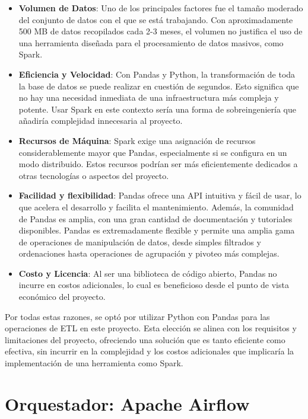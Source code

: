 \begin{itemize}
\item \textbf{Volumen de Datos}: Uno de los principales factores fue el tamaño moderado del conjunto de datos con el que se está trabajando. Con aproximadamente 500 MB de datos recopilados cada 2-3 meses, el volumen no justifica el uso de una herramienta diseñada para el procesamiento de datos masivos, como Spark.

\item \textbf{Eficiencia y Velocidad}: Con Pandas y Python, la transformación de toda la base de datos se puede realizar en cuestión de segundos. Esto significa que no hay una necesidad inmediata de una infraestructura más compleja y potente. Usar Spark en este contexto sería una forma de sobreingeniería que añadiría complejidad innecesaria al proyecto.

\item \textbf{Recursos de Máquina}: Spark exige una asignación de recursos considerablemente mayor que Pandas, especialmente si se configura en un modo distribuido. Estos recursos podrían ser más eficientemente dedicados a otras tecnologías o aspectos del proyecto.

\item \textbf{Facilidad y flexibilidad}: Pandas ofrece una API intuitiva y fácil de usar, lo que acelera el desarrollo y facilita el mantenimiento. Además, la comunidad de Pandas es amplia, con una gran cantidad de documentación y tutoriales disponibles. Pandas es extremadamente flexible y permite una amplia gama de operaciones de manipulación de datos, desde simples filtrados y ordenaciones hasta operaciones de agrupación y pivoteo más complejas.

\item \textbf{Costo y Licencia}: Al ser una biblioteca de código abierto, Pandas no incurre en costos adicionales, lo cual es beneficioso desde el punto de vista económico del proyecto.
\end{itemize}

Por todas estas razones, se optó por utilizar Python con Pandas para las operaciones de ETL en este proyecto. Esta elección se alinea con los requisitos y limitaciones del proyecto, ofreciendo una solución que es tanto eficiente como efectiva, sin incurrir en la complejidad y los costos adicionales que implicaría la implementación de una herramienta como Spark.

\section{Orquestador: Apache Airflow}

